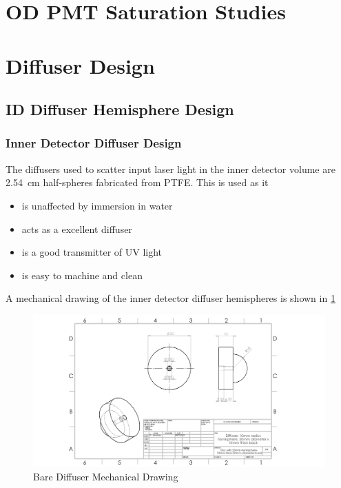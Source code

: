 \documentclass[a4paper,11pt]{article}
\begin{document}
\section{OD PMT Saturation Studies}\label{sec:saturation}

\section{Diffuser Design}\label{sec:diffuser}
\subsection{ID Diffuser Hemisphere Design}
\subsubsection{Inner Detector Diffuser Design}

The diffusers used to scatter input laser light in the inner detector volume are 2.54~cm half-spheres fabricated from PTFE. This is used as it
\begin{itemize}
\item is unaffected by immersion in water
\item acts as a excellent diffuser
\item is a good transmitter of UV light
\item is easy to machine and clean
\end{itemize}

A mechanical drawing of the inner detector diffuser hemispheres is shown in \cref{fig:Bare_Diffuser_Mechanical}

\begin{figure}
    \centering
    \includegraphics[width=\textwidth]{BareDiffuser.PNG}
    \caption{Bare Diffuser Mechanical Drawing}
    \label{fig:Bare_Diffuser_Mechanical}
\end{figure}
\end{document}
